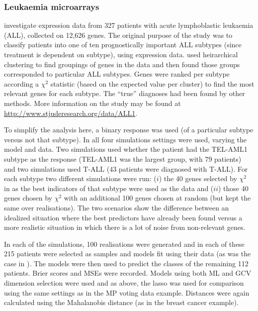 \subsubsection{Leukaemia microarrays}

 investigate expression data from 327 patients with acute lymphoblastic leukaemia (ALL), collected on 12,626 genes. The original purpose of the study was to classify patients into one of ten prognostically important ALL subtypes (since treatment is dependent on subtype), using expression data.  used heirarchical clustering to find groupings of genes in the data and then found those groups corresponded to particular ALL subtypes. Genes were ranked per subtype according a $\chi^2$ statistic (based on the expected value per cluster) to find the most relevant genes for each subtype. The ``true'' diagnoses had been found by other methods. More information on the study may be found at \url{http://www.stjuderesearch.org/data/ALL1}.

To simplify the analysis here, a binary response was used (of a particular subtype versus not that subtype). In all four simulations settings were used, varying the model and data. Two simulations used whether the patient had the TEL-AML1 subtype as the response (TEL-AML1 was the largest group, with 79 patients) and two simulations used T-ALL (43 patients were diagnosed with T-ALL). For each subtype two different simulations were run: ($i$) the 40 genes selected by $\chi^2$ in  as the best indicators of that subtype were used as the data and ($ii$) those 40 genes chosen by $\chi^2$ with an additional 100 genes chosen at random (but kept the same over realisations). The two scenarios show the difference between an idealized situation where the best predictors have already been found versus a more realistic situation in which there is a lot of noise from non-relevant genes. 

In each of the simulations, 100 realisations were generated and in each of these 215 patients were selected as samples and models fit using their data (as was the case in \cite{yeoh2002}). The models were then used to predict the classes of the remaining 112 patients. Brier scores and MSEs were recorded. Models using both ML and GCV dimension selection were used and as above, the lasso was used for comparison using the same settings as in the \label{cor-5s14}MP voting data example. Distances were again calculated using the Mahalanobis distance (as in the breast cancer example).

